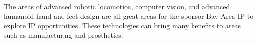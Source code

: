 \documentclass[titlepage,letterpaper,12pt]{article}
\begin{document}
\paragraph{}The areas of advanced robotic locomotion, computer vision, and
advanced humanoid hand and feet design are all great areas for the sponsor Bay
Area IP to explore IP opportunities. These technologies can bring many benefits
to areas such as manufacturing and prosthetics.

\clearpage
\printbibliography
\end{document}
